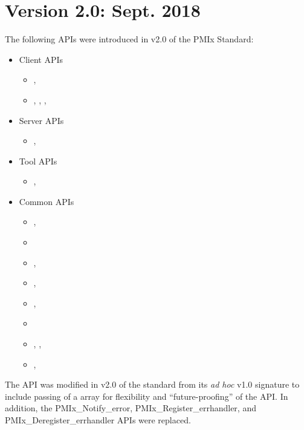 \section{Version 2.0: Sept. 2018}

The following \acp{API} were introduced in v2.0 of the PMIx Standard:

\begin{itemize}
\item Client APIs
\begin{itemize}
\item {}, 
\item {}, , , 
\end{itemize}
\item Server \acp{API}
\begin{itemize}
\item {}, 
\end{itemize}
\item Tool \acp{API}
\begin{itemize}
\item {}, 
\end{itemize}
\item Common \acp{API}
\begin{itemize}
\item {}, 
\item {}
\item {}, 
\item {}, 
\item {}, 
\item {}
\item {}, , 
\item {}, 
\end{itemize}
\end{itemize}

The  \ac{API} was modified in v2.0 of the standard from its \textit{ad hoc} v1.0 signature to include passing of a  array for flexibility and ``future-proofing'' of the \ac{API}.
In addition, the PMIx_Notify_error, PMIx_Register_errhandler, and PMIx_Deregister_errhandler \acp{API} were replaced.

